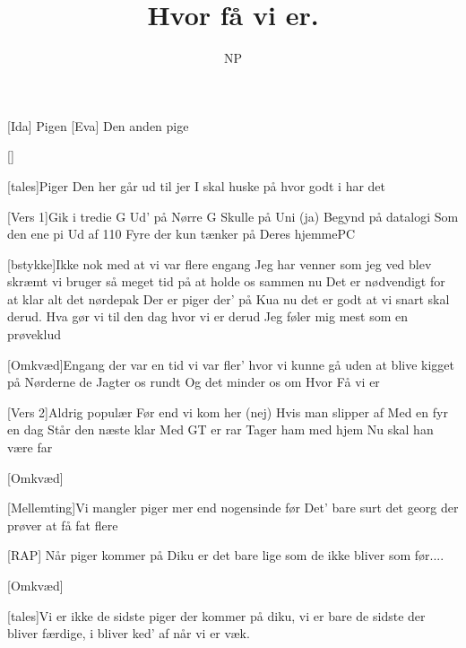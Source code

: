 \documentclass[a4paper]{article}
\title{Hvor få vi er.}
\author{NP}
\begin{document}
\maketitle

\begin{roles}
[Ida] Pigen
[Eva] Den anden pige
\end{roles}

\begin{props}
\prop{}[]
\end{props}

\begin{song}


[tales]Piger Den her går ud til jer
I skal huske på hvor godt i har det

[Vers 1]Gik i tredie G
Ud' på Nørre G
Skulle på Uni (ja)
Begynd på datalogi
Som den ene pi
Ud af 110
Fyre der kun tænker på Deres hjemmePC
	
[bstykke]Ikke nok med at vi var flere engang
Jeg har venner som jeg ved blev skræmt
vi bruger så meget tid på at holde os sammen nu
Det er nødvendigt for at klar alt det nørdepak
Der er piger der' på Kua nu
det er godt at vi snart skal derud.
Hva gør vi til den dag hvor vi er derud
Jeg føler mig mest som en prøveklud

[Omkvæd]Engang der var 
en tid vi var fler'
hvor vi kunne gå
uden at blive kigget på
Nørderne de
Jagter os rundt
Og det minder os om 
Hvor Få vi er

[Vers 2]Aldrig populær 
Før end vi kom her (nej)
Hvis man slipper af 
Med en fyr en dag
Står den næste klar 
Med GT er rar
Tager ham med  hjem
Nu skal han være far

[Omkvæd]

[Mellemting]Vi mangler piger mer end nogensinde før
Det' bare surt det georg der prøver at få fat flere

[RAP] Når piger kommer på Diku er det bare lige  som de ikke bliver som før....

[Omkvæd]

[tales]Vi  er ikke de sidste piger der kommer på diku, 
vi er bare de sidste der bliver færdige,
i bliver ked' af når vi er væk.

\end{song}
\end{document}
